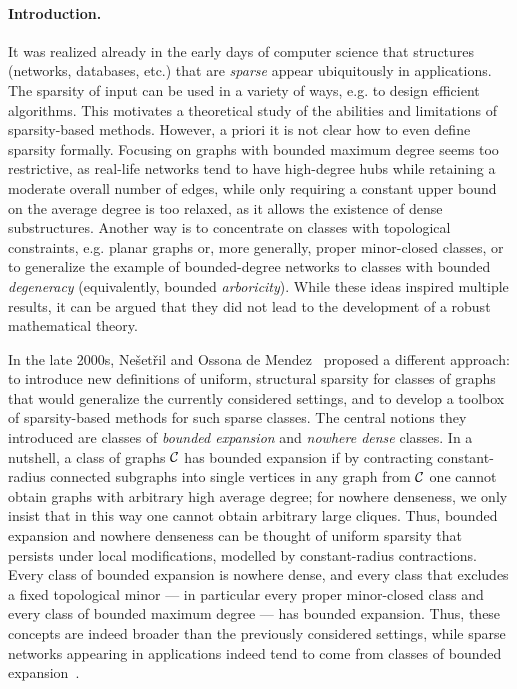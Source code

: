 \paragraph*{Introduction.}
It was realized already in the early days of computer science that structures (networks, databases, etc.) that are {\em{sparse}} appear ubiquitously in applications.
The sparsity of input can be used in a variety of ways, e.g. to design efficient algorithms. This motivates a theoretical study of the abilities and limitations of sparsity-based methods.
However, a priori it is not clear how to even define sparsity formally.
Focusing on graphs with bounded maximum degree seems too restrictive, as real-life networks tend to have high-degree hubs while retaining a moderate overall number of edges,
while only requiring a constant upper bound on the average degree is too relaxed, as it allows the existence of dense substructures.
Another way is to concentrate on classes with topological constraints, e.g. planar graphs or, more generally, proper minor-closed classes,
or to generalize the example of bounded-degree networks to classes with bounded {\em{degeneracy}} (equivalently, bounded {\em{arboricity}}).
While these ideas inspired multiple results, it can be argued that they did not lead to the development of a robust mathematical theory.

In the late 2000s, Ne\v{s}et\v{r}il and Ossona de Mendez~\cite{NesetrilM08,NesetrilM08a,NesetrilM08b} proposed a different approach:
to introduce new definitions of uniform, structural sparsity for classes of graphs that would generalize the currently considered settings,
and to develop a toolbox of sparsity-based methods for such sparse classes.
The central notions they introduced are classes of {\em{bounded expansion}} and {\em{nowhere dense}} classes.
In a nutshell, a class of graphs $\mathcal{C}$ has bounded expansion if by contracting constant-radius connected subgraphs into single vertices
in any graph from $\mathcal{C}$ one cannot obtain graphs with arbitrary high average degree; for nowhere denseness, we only insist that in this way one cannot obtain arbitrary large cliques.
Thus, bounded expansion and nowhere denseness can be thought of uniform sparsity that persists under local modifications, modelled by constant-radius contractions.
Every class of bounded expansion is nowhere dense, and every class that excludes a fixed topological minor --- in particular every proper minor-closed class and every class of bounded maximum degree ---
has bounded expansion. Thus, these concepts are indeed broader than the previously considered settings, while sparse networks appearing in applications indeed tend to come from
classes of bounded expansion~\cite{DemaineRRVSS14}.

